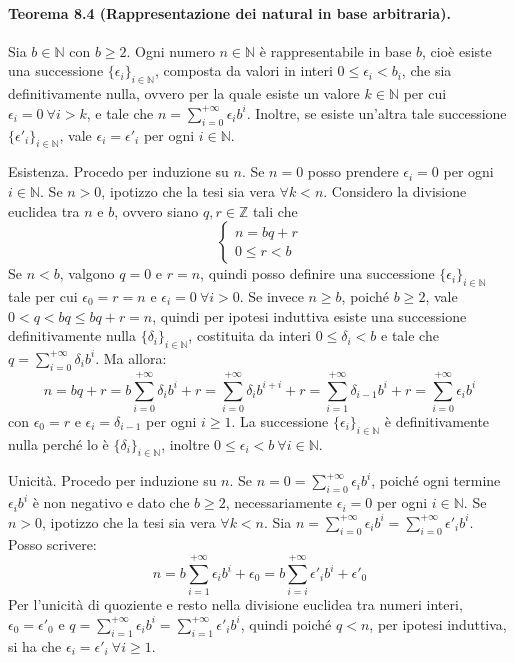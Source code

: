 \documentclass[12pt, a4paper]{report}
\theoremstyle{definition}
\newcommand{\Z}{\mathbb{Z}}
\newcommand{\N}{\mathbb{N}}
\begin{document}
\paragraph{Teorema 8.4 (Rappresentazione dei natural in base arbitraria).} Sia
$b\in\N$ con $b\geq 2$. Ogni numero $n\in\N$ è rappresentabile in base $b$, cioè
esiste una successione $\{\epsilon_i\}_{i\in\N}$, composta da valori in interi
$0\leq \epsilon_i<b_i$, che sia definitivamente nulla, ovvero per la quale
esiste un valore $k\in\N$ per cui $\epsilon_i=0\ \forall i>k$, e tale che
$n=\sum_{i=0}^{+\infty}\epsilon_ib^i$. Inoltre, se esiste un'altra tale
successione $\{\epsilon'_i\}_{i\in\N}$, vale $\epsilon_i=\epsilon'_i$ per ogni
$i\in\N$.
\begin{demonstration}
    Esistenza. Procedo per induzione su $n$. Se $n=0$ posso prendere $\epsilon_i=0$
    per ogni $i\in\N$. Se $n>0$, ipotizzo che la tesi sia vera $\forall k<n$.
    Considero la divisione euclidea tra $n$ e $b$, ovvero siano $q,r\in\Z$ tali che
    \[\begin{cases}
        n=bq+r\\
        0\leq r<b
    \end{cases}\]
    Se $n<b$, valgono $q=0$ e $r=n$, quindi posso definire una successione
    $\{\epsilon_i\}_{i\in\N}$ tale per cui $\epsilon_0=r=n$ e $\epsilon_i=0\
    \forall i>0$. Se invece $n\geq b$, poiché $b\geq2$, vale $0<q<bq\leq bq+r=n$,
    quindi per ipotesi induttiva esiste una successione definitivamente nulla
    $\{\delta_i\}_{i\in\N}$, costituita da interi $0\leq \delta_i<b$ e tale che
    $q=\sum_{i=0}^{+\infty}\delta_ib^i$. Ma allora:
    \[n=bq+r=b\sum_{i=0}^{+\infty}\delta_ib^i+r=\sum_{i=0}^{+\infty}\delta_ib^{i+i}
    +r=\sum_{i=1}^{+\infty}\delta_{i-1}b^i+r=\sum_{i=0}^{+\infty}\epsilon_ib^i\]
    con $\epsilon_0=r$ e $\epsilon_i=\delta_{i-1}$ per ogni $i\geq1$. La successione
    $\{\epsilon_i\}_{i\in\N}$ è definitivamente nulla perché lo è $\{\delta_i\}_
    {i\in\N}$, inoltre $0\leq\epsilon_i<b\ \forall i\in\N$.

    Unicità. Procedo per induzione su $n$. Se $n=0=\sum_{i=0}^{+\infty}\epsilon_ib^i$,
    poiché ogni termine $\epsilon_ib^i$ è non negativo e dato che $b\geq2$,
    necessariamente $\epsilon_i=0$ per ogni $i\in\N$.
    Se $n>0$, ipotizzo che la tesi sia vera $\forall k<n$. Sia $n=\sum_{i=0}^{+\infty}
    \epsilon_ib^i=\sum_{i=0}^{+\infty}\epsilon'_ib^i$. Posso scrivere:
    \[n=b\sum_{i=1}^{+\infty}\epsilon_ib^i+\epsilon_0=b\sum_{i=i}^{+\infty}
    \epsilon'_ib^i+\epsilon'_0\]
    Per l'unicità di quoziente e resto nella divisione euclidea tra numeri interi,
    $\epsilon_0=\epsilon'_0$ e $q=\sum_{i=1}^{+\infty}\epsilon_ib^i=\sum_{i=1}^
    {+\infty}\epsilon'_ib^i$, quindi poiché $q<n$, per ipotesi induttiva, si ha
    che $\epsilon_i=\epsilon'_i\ \forall i\geq1$.
\end{demonstration}
\end{document}
